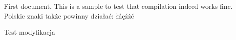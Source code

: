 \documentclass{article}
\begin{document}
First document. This is a sample to test that compilation indeed works fine.
Polskie znaki także powinny działać: łńęźżć


Test modyfikacja
\end{document}
